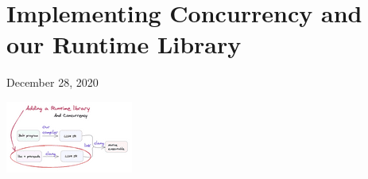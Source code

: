 %
%
%
%
%
%

\hypertarget{top-of-page}{%
\chapter{Implementing Concurrency and our Runtime
Library}\label{top-of-page}}

December 28, 2020

%

\includegraphics[width=\linewidth]{09_files/runtime-library.png}

